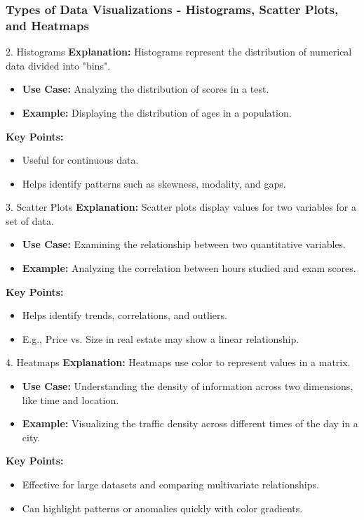 \documentclass[aspectratio=169]{beamer}
\begin{document}
\begin{frame}[fragile]
    \frametitle{Types of Data Visualizations - Histograms, Scatter Plots, and Heatmaps}
    \begin{block}{2. Histograms}
        \textbf{Explanation:} Histograms represent the distribution of numerical data divided into "bins".
        \begin{itemize}
            \item \textbf{Use Case:} Analyzing the distribution of scores in a test.
            \item \textbf{Example:} Displaying the distribution of ages in a population.
        \end{itemize}
        \textbf{Key Points:}
        \begin{itemize}
            \item Useful for continuous data.
            \item Helps identify patterns such as skewness, modality, and gaps.
        \end{itemize}
    \end{block}
    
    \begin{block}{3. Scatter Plots}
        \textbf{Explanation:} Scatter plots display values for two variables for a set of data.
        \begin{itemize}
            \item \textbf{Use Case:} Examining the relationship between two quantitative variables.
            \item \textbf{Example:} Analyzing the correlation between hours studied and exam scores.
        \end{itemize}
        \textbf{Key Points:}
        \begin{itemize}
            \item Helps identify trends, correlations, and outliers.
            \item E.g., Price vs. Size in real estate may show a linear relationship.
        \end{itemize}
    \end{block}
    
    \begin{block}{4. Heatmaps}
        \textbf{Explanation:} Heatmaps use color to represent values in a matrix.
        \begin{itemize}
            \item \textbf{Use Case:} Understanding the density of information across two dimensions, like time and location.
            \item \textbf{Example:} Visualizing the traffic density across different times of the day in a city.
        \end{itemize}
        \textbf{Key Points:}
        \begin{itemize}
            \item Effective for large datasets and comparing multivariate relationships.
            \item Can highlight patterns or anomalies quickly with color gradients.
        \end{itemize}
    \end{block}
\end{frame}
\end{document}
